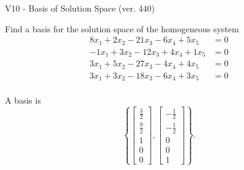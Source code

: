 \begin{exercise}
  \begin{exerciseTitle}V10 - Basis of Solution Space (ver. 440)\end{exerciseTitle}
  \begin{exerciseStatement}
    Find a basis for the solution space of the homogeneous system 
\begin{align*}
 8 x_ 1 + 2 x_ 2 -21 x_ 3 -6 x_ 4 + 5 x_ 5 &= 0  \\ 
  -1 x_ 1 + 3 x_ 2 -12 x_ 3 + 4 x_ 4 + 1 x_ 5 &= 0  \\ 
  3 x_ 1 + 5 x_ 2 -27 x_ 3 -4 x_ 4 + 4 x_ 5 &= 0  \\ 
  3 x_ 1 + 3 x_ 2 -18 x_ 3 -6 x_ 4 + 3 x_ 5 &= 0  \\ 
 \end{align*}


 
  \end{exerciseStatement}

  \begin{exerciseAnswer}
   A basis is   
\[\left\{\left[\begin{array}{c}
\frac{3}{2} \\
\frac{9}{2} \\
1 \\
0 \\
0
\end{array}\right] , \left[\begin{array}{c}
-\frac{1}{2} \\
-\frac{1}{2} \\
0 \\
0 \\
1
\end{array}\right]\right\}.\]

  


  \end{exerciseAnswer}
\end{exercise}
